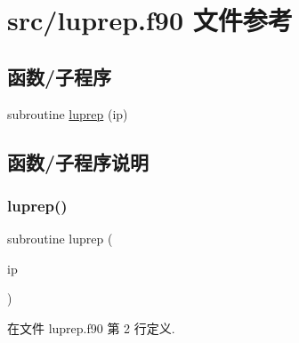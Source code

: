 \hypertarget{luprep_8f90}{}\section{src/luprep.f90 文件参考}
\label{luprep_8f90}
\subsection*{函数/子程序}
\begin{DoxyCompactItemize}
\item 
subroutine \mbox{\hyperlink{luprep_8f90_a84218764eaa8561b110ac40ee6532d54}{luprep}} (ip)
\end{DoxyCompactItemize}


\subsection{函数/子程序说明}
\mbox{\label{luprep_8f90_a84218764eaa8561b110ac40ee6532d54}} 
\subsubsection{\texorpdfstring{luprep()}{luprep()}}
{\footnotesize\ttfamily subroutine luprep (\begin{DoxyParamCaption}\item[{}]{ip }\end{DoxyParamCaption})}



在文件 luprep.\+f90 第 2 行定义.

